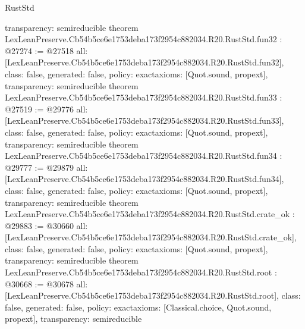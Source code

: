 \begin{lexlean}{RustStd}
\begin{coremodule}
{  transparency: semireducible
}
theorem LexLeanPreserve.Cb54b5ce6e1753deba173f2954c882034.R20.RustStd.fun32 : @27274 := @27518 {
  all: [LexLeanPreserve.Cb54b5ce6e1753deba173f2954c882034.R20.RustStd.fun32],
  class: false,
  generated: false,
  policy: exact{axioms: [Quot.sound, propext]},
  transparency: semireducible
}
theorem LexLeanPreserve.Cb54b5ce6e1753deba173f2954c882034.R20.RustStd.fun33 : @27519 := @29776 {
  all: [LexLeanPreserve.Cb54b5ce6e1753deba173f2954c882034.R20.RustStd.fun33],
  class: false,
  generated: false,
  policy: exact{axioms: [Quot.sound, propext]},
  transparency: semireducible
}
theorem LexLeanPreserve.Cb54b5ce6e1753deba173f2954c882034.R20.RustStd.fun34 : @29777 := @29879 {
  all: [LexLeanPreserve.Cb54b5ce6e1753deba173f2954c882034.R20.RustStd.fun34],
  class: false,
  generated: false,
  policy: exact{axioms: [Quot.sound, propext]},
  transparency: semireducible
}
theorem LexLeanPreserve.Cb54b5ce6e1753deba173f2954c882034.R20.RustStd.crate_ok : @29883 := @30660 {
  all: [LexLeanPreserve.Cb54b5ce6e1753deba173f2954c882034.R20.RustStd.crate_ok],
  class: false,
  generated: false,
  policy: exact{axioms: [Quot.sound, propext]},
  transparency: semireducible
}
theorem LexLeanPreserve.Cb54b5ce6e1753deba173f2954c882034.R20.RustStd.root : @30668 := @30678 {
  all: [LexLeanPreserve.Cb54b5ce6e1753deba173f2954c882034.R20.RustStd.root],
  class: false,
  generated: false,
  policy: exact{axioms: [Classical.choice, Quot.sound, propext]},
  transparency: semireducible
}


\end{coremodule}
\end{lexlean}
